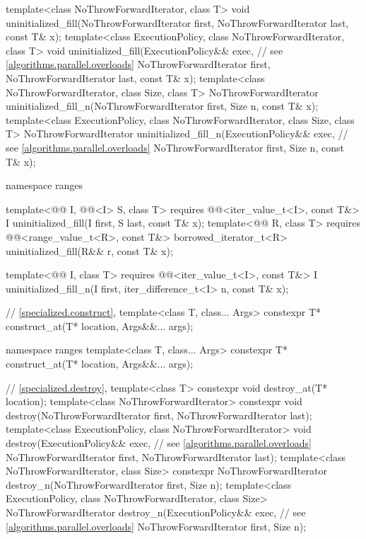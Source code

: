 \begin{codeblock}
{  template<class NoThrowForwardIterator, class T>
    void uninitialized_fill(NoThrowForwardIterator first, NoThrowForwardIterator last,
                            const T& x);
  template<class ExecutionPolicy, class NoThrowForwardIterator, class T>
    void uninitialized_fill(ExecutionPolicy&& exec,             // see \ref{algorithms.parallel.overloads}
                            NoThrowForwardIterator first, NoThrowForwardIterator last,
                            const T& x);
  template<class NoThrowForwardIterator, class Size, class T>
    NoThrowForwardIterator
      uninitialized_fill_n(NoThrowForwardIterator first, Size n, const T& x);
  template<class ExecutionPolicy, class NoThrowForwardIterator, class Size, class T>
    NoThrowForwardIterator
      uninitialized_fill_n(ExecutionPolicy&& exec,              // see \ref{algorithms.parallel.overloads}
                           NoThrowForwardIterator first, Size n, const T& x);

  namespace ranges {
    template<@@ I, @@<I> S, class T>
      requires @@<iter_value_t<I>, const T&>
        I uninitialized_fill(I first, S last, const T& x);
    template<@@ R, class T>
      requires @@<range_value_t<R>, const T&>
        borrowed_iterator_t<R> uninitialized_fill(R&& r, const T& x);

    template<@@ I, class T>
      requires @@<iter_value_t<I>, const T&>
        I uninitialized_fill_n(I first, iter_difference_t<I> n, const T& x);
  }

  // \ref{specialized.construct}, 
  template<class T, class... Args>
    constexpr T* construct_at(T* location, Args&&... args);

  namespace ranges {
    template<class T, class... Args>
      constexpr T* construct_at(T* location, Args&&... args);
  }

  // \ref{specialized.destroy}, 
  template<class T>
    constexpr void destroy_at(T* location);
  template<class NoThrowForwardIterator>
    constexpr void destroy(NoThrowForwardIterator first, NoThrowForwardIterator last);
  template<class ExecutionPolicy, class NoThrowForwardIterator>
    void destroy(ExecutionPolicy&& exec,                        // see \ref{algorithms.parallel.overloads}
                 NoThrowForwardIterator first, NoThrowForwardIterator last);
  template<class NoThrowForwardIterator, class Size>
    constexpr NoThrowForwardIterator destroy_n(NoThrowForwardIterator first, Size n);
  template<class ExecutionPolicy, class NoThrowForwardIterator, class Size>
    NoThrowForwardIterator destroy_n(ExecutionPolicy&& exec,    // see \ref{algorithms.parallel.overloads}
                                     NoThrowForwardIterator first, Size n);

}
\end{codeblock}
